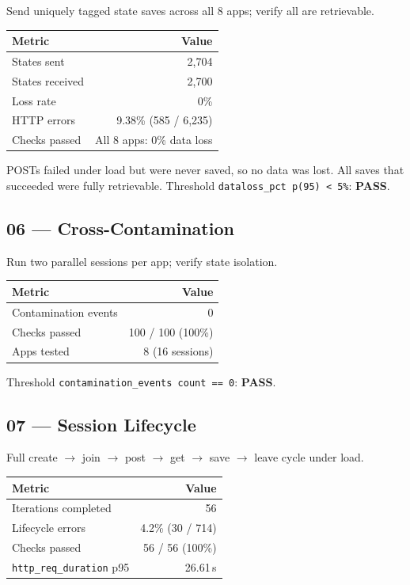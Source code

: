 \documentclass[11pt,a4paper]{article}
\newcommand{\pass}{\textcolor{pass}{\textbf{PASS}}}
\begin{document}
Send uniquely tagged state saves across all 8 apps; verify all are retrievable.

\begin{tabular}{@{}lr@{}}
\toprule
\textbf{Metric} & \textbf{Value} \\
\midrule
States sent     & 2,704 \\
States received & 2,700 \\
Loss rate       & 0\% \\
HTTP errors     & 9.38\% (585 / 6,235) \\
Checks passed   & All 8 apps: 0\% data loss \\
\bottomrule
\end{tabular}

\medskip
{} POSTs failed under load but were never saved, so no data was
lost. All saves that succeeded were fully retrievable.
Threshold \texttt{dataloss\_pct p(95) < 5\%}: \pass.

\subsection{06 — Cross-Contamination}

Run two parallel sessions per app; verify state isolation.

\begin{tabular}{@{}lr@{}}
\toprule
\textbf{Metric} & \textbf{Value} \\
\midrule
Contamination events & 0 \\
Checks passed        & 100 / 100 (100\%) \\
Apps tested          & 8 (16 sessions) \\
\bottomrule
\end{tabular}

\medskip
\noindent Threshold \texttt{contamination\_events count == 0}: \pass.

\subsection{07 — Session Lifecycle}

Full create $\to$ join $\to$ post $\to$ get $\to$ save $\to$ leave cycle under load.

\begin{tabular}{@{}lr@{}}
\toprule
\textbf{Metric} & \textbf{Value} \\
\midrule
Iterations completed & 56 \\
Lifecycle errors     & 4.2\% (30 / 714) \\
Checks passed        & 56 / 56 (100\%) \\
\texttt{http\_req\_duration} p95 & 26.61\,s \\
\bottomrule
\end{tabular}
\end{document}
